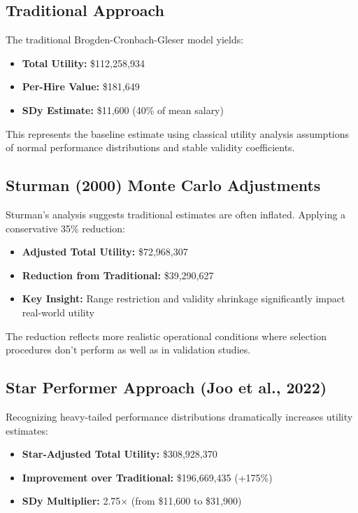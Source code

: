 \documentclass[
]{article}
\providecommand{\tightlist}{%
  \setlength{\itemsep}{0pt}\setlength{\parskip}{0pt}}
\begin{document}
\subsection{Traditional Approach}\label{traditional-approach}

The traditional Brogden-Cronbach-Gleser model yields:

\begin{itemize}
\tightlist
\item
  \textbf{Total Utility:} \$112,258,934
\item
  \textbf{Per-Hire Value:} \$181,649
\item
  \textbf{SDy Estimate:} \$11,600 (40\% of mean salary)
\end{itemize}

This represents the baseline estimate using classical utility analysis
assumptions of normal performance distributions and stable validity
coefficients.

\subsection{Sturman (2000) Monte Carlo
Adjustments}\label{sturman-2000-monte-carlo-adjustments}

Sturman's analysis suggests traditional estimates are often inflated.
Applying a conservative 35\% reduction:

\begin{itemize}
\tightlist
\item
  \textbf{Adjusted Total Utility:} \$72,968,307
\item
  \textbf{Reduction from Traditional:} \$39,290,627
\item
  \textbf{Key Insight:} Range restriction and validity shrinkage
  significantly impact real-world utility
\end{itemize}

The reduction reflects more realistic operational conditions where
selection procedures don't perform as well as in validation studies.

\subsection{Star Performer Approach (Joo et al.,
2022)}\label{star-performer-approach-joo-et-al.-2022}

Recognizing heavy-tailed performance distributions dramatically
increases utility estimates:

\begin{itemize}
\tightlist
\item
  \textbf{Star-Adjusted Total Utility:} \$308,928,370
\item
  \textbf{Improvement over Traditional:} \$196,669,435 (+175\%)
\item
  \textbf{SDy Multiplier:} 2.75× (from \$11,600 to \$31,900)
\end{itemize}
\end{document}
